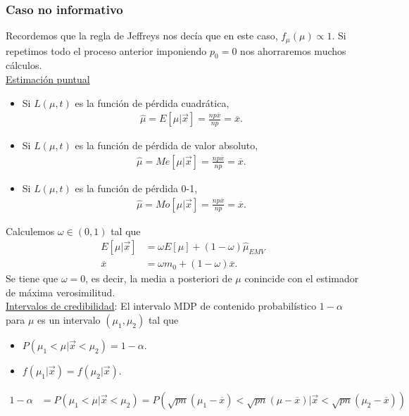 \subsubsection{Caso no informativo}
\noindent Recordemos que la regla de Jeffreys nos decía que en este caso, $f_{\mu}(\mu) \propto 1$. Si repetimos todo el proceso anterior imponiendo $p_0 =0$ nos ahorraremos muchos cálculos.
\\
\newline
\noindent \underline{Estimación puntual}
\begin{itemize}
    \item Si $L(\mu,t)$ es la función de pérdida cuadrática, 
    \begin{align*}
        \widehat{\mu} = E[\mu |  \vec{x}] = \frac{np \overline{x}}{np} = \overline{x}.
    \end{align*}
    \item Si $L(\mu,t)$ es la función de pérdida de valor absoluto, 
        \begin{align*}
        \widehat{\mu} = Me[\mu |  \vec{x}] = \frac{np \overline{x}}{np} = \overline{x}.
    \end{align*}
    \item Si $L(\mu,t)$ es la función de pérdida 0-1, 
        \begin{align*}
        \widehat{\mu} = Mo[\mu |  \vec{x}] = \frac{np \overline{x}}{np} = \overline{x}.
    \end{align*}
\end{itemize}
Calculemos $\omega \in (0,1)$ tal que 
\begin{align*}
    E[\mu  | \vec{x}] &= \omega E[\mu]  + (1 - \omega) \widehat{\mu }_{EMV}  \\
    \overline{x}&= \omega m_0 + (1-\omega) \overline{x}.
\end{align*}
Se tiene que $\omega = 0$, es decir, la media a posteriori de $\mu$ conincide con el estimador de máxima verosimilitud.
\\
\newline
\noindent \underline{Intervalos de credibilidad}: El intervalo MDP de contenido probabilístico $1-\alpha$ para $\mu$ es un intervalo $(\mu_1,\mu_2)$ tal que
\begin{itemize}
    \item $P(\mu_1 < \mu | \vec{x} < \mu_2) = 1-\alpha$.
    \item $f(\mu_1| \vec{x}) = f(\mu_2 | \vec{x})$.
\end{itemize}
\begin{align*}
    1 - \alpha &= P(\mu_1 < \mu | \vec{x} < \mu_2) = P(\sqrt{pn}(\mu_1 - \overline{x}) < \sqrt{pn}(\mu - \overline{x}) | \vec{x} < \sqrt{pn}(\mu_2 - \overline{x})) 
\end{align*}
